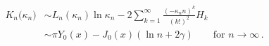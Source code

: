 \begin{equation}
\begin{split}
K_n\big(\kappa_n\big) &\sim 
L_n(\kappa_n)
\ln \kappa_n - 2 \sum_{k=1}^\infty \frac{(-\kappa_n n)^k}{(k!)^2}
H_k   \\
&\sim \pi Y_0(x)-J_0(x)(\ln n +2\gamma)
\qquad\text{for $n\rightarrow\infty$}\,.
\end{split}
\end{equation}

